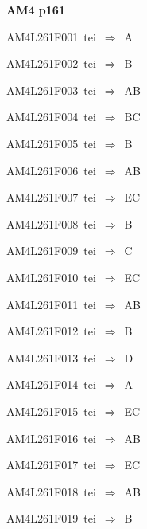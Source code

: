 \par\vfill\eject
{\bf\hfill AM4 p161\hfill\hbox{}}\par\bigskip
{\sixrm AM4L261F001\ {\sixit tei}\ }$\Rightarrow$\ A\par\smallskip
{\sixrm AM4L261F002\ {\sixit tei}\ }$\Rightarrow$\ B\par\smallskip
{\sixrm AM4L261F003\ {\sixit tei}\ }$\Rightarrow$\ AB\par\smallskip
{\sixrm AM4L261F004\ {\sixit tei}\ }$\Rightarrow$\ BC\par\smallskip
{\sixrm AM4L261F005\ {\sixit tei}\ }$\Rightarrow$\ B\par\smallskip
{\sixrm AM4L261F006\ {\sixit tei}\ }$\Rightarrow$\ AB\par\smallskip
{\sixrm AM4L261F007\ {\sixit tei}\ }$\Rightarrow$\ EC\par\smallskip
{\sixrm AM4L261F008\ {\sixit tei}\ }$\Rightarrow$\ B\par\smallskip
{\sixrm AM4L261F009\ {\sixit tei}\ }$\Rightarrow$\ C\par\smallskip
{\sixrm AM4L261F010\ {\sixit tei}\ }$\Rightarrow$\ EC\par\smallskip
{\sixrm AM4L261F011\ {\sixit tei}\ }$\Rightarrow$\ AB\par\smallskip
{\sixrm AM4L261F012\ {\sixit tei}\ }$\Rightarrow$\ B\par\smallskip
{\sixrm AM4L261F013\ {\sixit tei}\ }$\Rightarrow$\ D\par\smallskip
{\sixrm AM4L261F014\ {\sixit tei}\ }$\Rightarrow$\ A\par\smallskip
{\sixrm AM4L261F015\ {\sixit tei}\ }$\Rightarrow$\ EC\par\smallskip
{\sixrm AM4L261F016\ {\sixit tei}\ }$\Rightarrow$\ AB\par\smallskip
{\sixrm AM4L261F017\ {\sixit tei}\ }$\Rightarrow$\ EC\par\smallskip
{\sixrm AM4L261F018\ {\sixit tei}\ }$\Rightarrow$\ AB\par\smallskip
{\sixrm AM4L261F019\ {\sixit tei}\ }$\Rightarrow$\ B\par\smallskip

